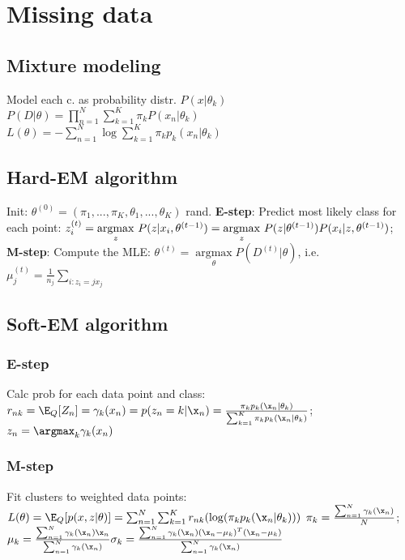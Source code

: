 \section*{Missing data}
\subsection*{Mixture modeling}

Model each c. as probability distr. $P(x|\theta_k)$\\
$P(D|\theta) = \prod_{n=1}^N \sum_{k=1}^K \pi_k P(x_n|\theta_k)$\\
$L(\theta) = - \sum_{n=1}^N \operatorname{log}  \sum_{k=1}^K \pi_k p_k(x_n| \theta_k)$

\subsection*{Hard-EM algorithm}
Init: $\theta^{(0)}=(\pi_1,...,\pi_K, \theta_1,...,\theta_K)$ rand.
\textbf{E-step}: Predict most likely class for each point:
$z_i^{(t)} = \underset{z}{\operatorname{argmax}} ~ P(z|x_i, \theta^{(t-1)})\\
= \underset{z}{\operatorname{argmax}} ~ P(z|\theta^{(t-1)}) P(x_i|z,\theta^{(t-1)})$;\\
\textbf{M-step}: Compute the MLE: $\theta^{(t)} = \underset{\theta}{\operatorname{argmax}} P(D^{(t)}|\theta)$, i.e. $\mu_j^{(t)} = \frac{1}{n_j} \sum_{i: z_i = j x_j}$

\subsection*{Soft-EM algorithm}
\subsubsection*{E-step} Calc prob for each data point and class:
$r_{nk}=\E_Q[Z_n]=\gamma_k(x_n)=p(z_n=k|\x_n)=\frac{\pi_kp_k(\x_n|\theta_k)}{\sum_{k=1}^K\pi_kp_k(\x_n|\theta_k)}$;
$z_n=\argmax_k \gamma_k(x_n)$
\subsubsection*{M-step} Fit clusters to weighted data points:
$L(\theta)=\E_Q[p(x,z|\theta)]=\sum_{n=1}^N\sum_{k=1}^Kr_{nk}(\log(\pi_kp_k(\x_n|\theta_k)))$
$\pi_k = \frac{\sum_{n=1}^N \gamma_k (\x_n)}{N} $; 
$\mu_k = \frac{\sum_{n=1}^N \gamma_k (\x_n) \x_n}{\sum_{n=1}^N \gamma_k (\x_n)}\\ %
\sigma_k = \frac{\sum_{n=1}^N \gamma_k(\x_n) (\x_n - \mu_k)^T (\x_n - \mu_k)}{\sum_{n=1}^N \gamma_k(\x_n)}$

